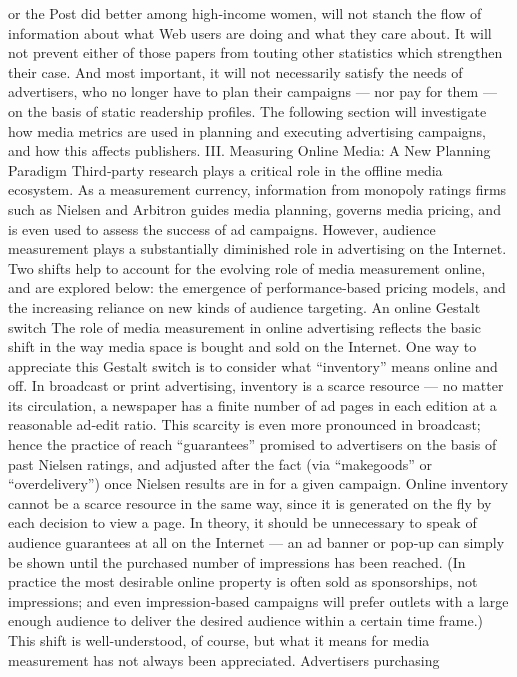 or the Post did better among high‐income women, will not stanch the flow
of information about what Web users are doing and what they care about.
It will not prevent either of those papers from touting other statistics
which strengthen their case. And most important, it will not necessarily
satisfy the needs of advertisers, who no longer have to plan their
campaigns — nor pay for them — on the basis of static readership
profiles. The following section will investigate how media metrics are
used in planning and executing advertising campaigns, and how this
affects publishers.
III. Measuring Online Media: A New Planning Paradigm
Third‐party research plays a critical role in the offline media ecosystem.
As a measurement currency, information from monopoly ratings firms
such as Nielsen and Arbitron guides media planning, governs media
pricing, and is even used to assess the success of ad campaigns. However,
audience measurement plays a substantially diminished role in
advertising on the Internet. Two shifts help to account for the evolving
role of media measurement online, and are explored below: the
emergence of performance‐based pricing models, and the increasing
reliance on new kinds of audience targeting.
An online Gestalt switch
The role of media measurement in online advertising reflects the basic
shift in the way media space is bought and sold on the Internet. One way
to appreciate this Gestalt switch is to consider what ``inventory'' means
online and off. In broadcast or print advertising, inventory is a scarce
resource — no matter its circulation, a newspaper has a finite number of
ad pages in each edition at a reasonable ad‐edit ratio. This scarcity is even
more pronounced in broadcast; hence the practice of reach ``guarantees''
promised to advertisers on the basis of past Nielsen ratings, and adjusted
after the fact (via ``makegoods'' or ``overdelivery'') once Nielsen results are
in for a given campaign.
Online inventory cannot be a scarce resource in the same way, since it is
generated on the fly by each decision to view a page. In theory, it should
be unnecessary to speak of audience guarantees at all on the Internet — an
ad banner or pop‐up can simply be shown until the purchased number of
impressions has been reached. (In practice the most desirable online
property is often sold as sponsorships, not impressions; and even
impression‐based campaigns will prefer outlets with a large enough
audience to deliver the desired audience within a certain time frame.)
This shift is well‐understood, of course, but what it means for media
measurement has not always been appreciated. Advertisers purchasing
